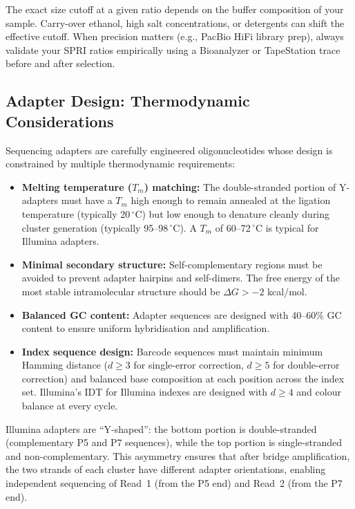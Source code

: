 \begin{tipbox}[title={Optimising SPRI Ratios}]
The exact size cutoff at a given ratio depends on the buffer composition of your sample. Carry-over ethanol, high salt concentrations, or detergents can shift the effective cutoff. When precision matters (e.g., PacBio HiFi library prep), always validate your SPRI ratios empirically using a Bioanalyzer or TapeStation trace before and after selection.
\end{tipbox}


\subsection{Adapter Design: Thermodynamic Considerations}
\label{subsec:libprep:adapter-thermo}

Sequencing adapters are carefully engineered oligonucleotides whose design is constrained by multiple thermodynamic requirements:

\begin{itemize}[itemsep=2pt]
  \item \textbf{Melting temperature ($T_m$) matching:} The double-stranded portion of Y-adapters must have a $T_m$ high enough to remain annealed at the ligation temperature (typically 20$\,^\circ$C) but low enough to denature cleanly during cluster generation (typically 95--98$\,^\circ$C). A $T_m$ of 60--72$\,^\circ$C is typical for Illumina adapters.
  \item \textbf{Minimal secondary structure:} Self-complementary regions must be avoided to prevent adapter hairpins and self-dimers. The free energy of the most stable intramolecular structure should be $\Delta G > -2$ kcal/mol.
  \item \textbf{Balanced GC content:} Adapter sequences are designed with 40--60\% GC content to ensure uniform hybridisation and amplification.
  \item \textbf{Index sequence design:} Barcode sequences must maintain minimum Hamming distance ($d \geq 3$ for single-error correction, $d \geq 5$ for double-error correction) and balanced base composition at each position across the index set. Illumina's IDT for Illumina indexes are designed with $d \geq 4$ and colour balance at every cycle.
\end{itemize}

\begin{keyconcept}[title={Why Y-Shaped Adapters?}]
Illumina adapters are ``Y-shaped'': the bottom portion is double-stranded (complementary P5 and P7 sequences), while the top portion is single-stranded and non-complementary. This asymmetry ensures that after bridge amplification, the two strands of each cluster have different adapter orientations, enabling independent sequencing of Read~1 (from the P5 end) and Read~2 (from the P7 end).
\end{keyconcept}


